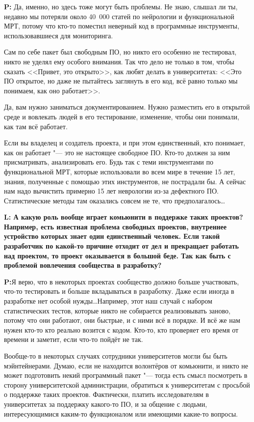 \documentclass[10pt, a5paper]{article}
\begin{document}
\begin{Parallel}[p]{}{}
{{\noindent \bf P:} Да, именно, но здесь тоже могут быть проблемы. Не знаю, слышал ли ты, недавно мы потеряли около 40~000 статей по нейрологии и функциональной МРТ, потому что кто-то поместил неверный код в программные инструменты, использовавшиеся для мониторинга. 

Сам по себе пакет был свободным ПО, но никто его особенно не тестировал, никто не уделял ему особого внимания. Так что дело не только в том, чтобы сказать <<Привет, это открыто>>, как любят делать в университетах: <<Это ПО открытое, но даже не пытайтесь заглянуть в его код, всё равно только мы понимаем, как оно работает>>. 

Да, вам нужно заниматься документированием. Нужно разместить его в открытой среде и вовлекать людей в его тестирование, изменение, чтобы они понимали, как там всё работает.

Если вы владелец и создатель проекта, и при этом единственный, кто понимает, как он работает "--- это не настоящее свободное ПО. Кто-то должен за ним присматривать, анализировать его. Будь так с теми инструментами по функциональной МРТ, которые использовали во всем мире в течение 15 лет, знания, полученные с помощью этих инструментов, не пострадали бы. А сейчас нам надо вычистить примерно 15 лет неврологии из-за дефектного ПО. Статистические методы там оказались совсем не те, что предполагалось\ldots

{\noindent \bf L: А какую роль вообще играет комьюнити в поддержке таких проектов? Например, есть известная проблема свободных проектов, внутреннее устройство которых знает один единственный человек. Если такой разработчик по какой-то причине отходит от дел и прекращает работать над проектом, то проект оказывается в большой беде. Так как быть с проблемой вовлечения сообщества в разработку?}

{\noindent \bf P:}Я верю, что в некоторых проектах сообщество должно больше участвовать, что-то тестировать и больше вкладываться в разработку. Даже если иногда в разработке нет особой нужды\ldots Например, этот наш случай с набором статистических тестов, которые никто не собирается реализовывать заново, потому что они работают, они быстрые, и с ними всё в порядке. И всё же нам нужен кто-то кто реально возится с кодом. Кто-то, кто проверяет его время от времени и заметит, если что-то пойдёт не так. 

Вообще-то в некоторых случаях сотрудники университетов могли бы быть мэйнтейнерами. Думаю, если не находится волонтёров от комьюнити, и никто не может подготовить некий программный пакет "--- тогда есть смысл посмотреть в сторону университетской администрации, обратиться к университетам с просьбой о поддержке таких проектов. Фактически, платить исследователям в университетах за поддержку какого-то ПО, и за общение с людьми, интересующимися каким-то функционалом или имеющими какие-то вопросы. 

}
\end{Parallel}
\end{document}

